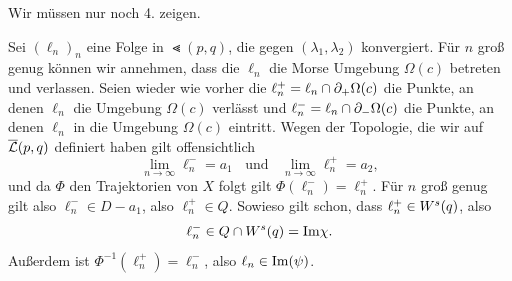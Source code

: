 \begin{bigproof}
    Wir müssen nur noch 4. zeigen.

    Sei $(\ell_n)_n$ eine Folge in $\Lt (p, q)$, die gegen $(\lambda_1, \lambda_2)$ konvergiert. 
    Für $n$ groß genug können wir annehmen, dass die $\ell_n$ die Morse Umgebung $\Omega (c)$ betreten 
    und verlassen. Seien wieder wie vorher die $\ell_n^+ = \ell_n \cap { \partial }_+ \Omega (c)$ die Punkte, 
    an denen $\ell_n$ die Umgebung $\Omega (c)$ verlässt und $\ell_n^- = \ell_n \cap { \partial }_- \Omega (c)$
    die Punkte, an denen $\ell_n$ in die Umgebung $\Omega (c)$ eintritt. Wegen der Topologie, die wir 
    auf ${\overline{\mathcal{L}} }(p, q)$ definiert haben gilt offensichtlich
    \[ \lim_{n \to \infty} \ell_n^- = a_1 \; \; \text{ und } \; \; \lim_{n \to \infty} \ell_n^+ = a_2 , \]
    und da $\Phi$ den Trajektorien von $X$ folgt gilt $\Phi(\ell_n^-) = \ell_n^+$.
    Für $n$ groß genug gilt also $\ell_n^- \in D - a_1$, also $\ell_n^+ \in Q$. Sowieso gilt schon, dass
    $\ell_n^+ \in { W^s } (q)$, also 
    \[ \ell_n^- \in Q \cap { W^s } (q) = { \operatorname{Im} } \chi . \]
    Außerdem ist $\Phi^{-1}(\ell_n^+) = \ell_n^-$, also $\ell_n \in { \operatorname{Im} } (\psi)$.
\end{bigproof}




